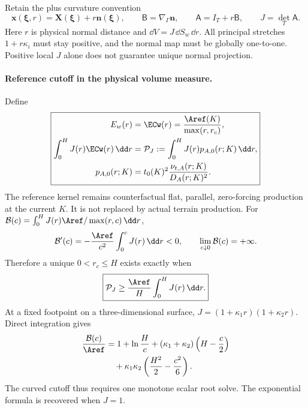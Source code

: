 Retain the plus curvature convention
\begin{equation}
 \bm x(\bm\xi,r)=\bm X(\bm\xi)+r\bm n(\bm\xi),\qquad
 \mathsf B=\nabla_\Gamma\bm n,\qquad
 \mathsf A=I_T+r\mathsf B,\qquad J=\det_T\mathsf A.
 \label{eq:accepted-curved-map}
\end{equation}
Here $r$ is physical normal distance and $\dd V=J\,\dd S_w\,\dd r$.
All principal stretches $1+r\kappa_i$ must stay positive, and
the normal map must be globally one-to-one. Positive local $J$
alone does not guarantee unique normal projection.

\paragraph{Reference cutoff in the physical volume measure.}
Define
\begin{equation}
 \boxed{\begin{aligned}
 E_w(r)&=\ECw(r)=\frac{\Aref(K)}{\max(r,r_c)},\\
 \int_0^H J(r)\ECw(r)\,\dd r
 &=\mathcal P_J:=\int_0^H J(r)p_{A,0}(r;K)\,\dd r,\\
 p_{A,0}(r;K)&=t_0(K)^2
              \frac{\nu_{t,A}(r;K)}{D_A(r;K)^2}.
 \end{aligned}}
 \label{eq:accepted-curved-budget}
\end{equation}
The reference kernel remains counterfactual flat, parallel,
zero-forcing production at the current $K$. It is not replaced
by actual terrain production.
For $\mathcal B(c)=\int_0^H J(r)\Aref/\max(r,c)\,\dd r$,
\begin{equation}
 \mathcal B'(c)=-\frac{\Aref}{c^2}\int_0^cJ(r)\,\dd r<0,
 \qquad \lim_{c\downarrow0}\mathcal B(c)=+\infty.
 \label{eq:accepted-curved-monotonicity}
\end{equation}
Therefore a unique $0<r_c\leq H$ exists exactly when
\begin{equation}
 \boxed{\mathcal P_J\geq
 \frac{\Aref}{H}\int_0^HJ(r)\,\dd r.}
 \label{eq:accepted-curved-gate}
\end{equation}
At a fixed footpoint on a three-dimensional surface,
$J=(1+\kappa_1r)(1+\kappa_2r)$. Direct integration gives
\begin{equation}
 \begin{aligned}
 \frac{\mathcal B(c)}{\Aref}
 &=1+\ln\frac Hc
 +(\kappa_1+\kappa_2)\left(H-\frac c2\right)\\
 &\quad+\kappa_1\kappa_2
       \left(\frac{H^2}{2}-\frac{c^2}{6}\right).
 \end{aligned}
 \label{eq:accepted-curved-budget-explicit}
\end{equation}
The curved cutoff thus requires one monotone scalar root solve.
The exponential formula is recovered when $J=1$.


